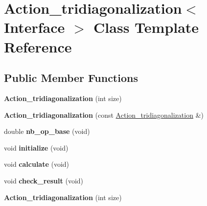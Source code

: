 \hypertarget{class_action__tridiagonalization}{}\section{Action\+\_\+tridiagonalization$<$ Interface $>$ Class Template Reference}
\label{class_action__tridiagonalization}
\subsection*{Public Member Functions}
\begin{DoxyCompactItemize}
\item 
\mbox{\label{class_action__tridiagonalization_a8d279f41467193bfba3154c4c6b06803}} 
{\bfseries Action\+\_\+tridiagonalization} (int size)
\item 
\mbox{\label{class_action__tridiagonalization_a8c56518c3b051aa81d9f206db803540f}} 
{\bfseries Action\+\_\+tridiagonalization} (const \hyperlink{class_action__tridiagonalization}{Action\+\_\+tridiagonalization} \&)
\item 
\mbox{\label{class_action__tridiagonalization_a78044c19d7428b20b0bb28b98a4b952d}} 
double {\bfseries nb\+\_\+op\+\_\+base} (void)
\item 
\mbox{\label{class_action__tridiagonalization_a41a1f82250727e2ebf3426ce0c28ddf7}} 
void {\bfseries initialize} (void)
\item 
\mbox{\label{class_action__tridiagonalization_a58d13671dd11a847e0a01a93dec683a3}} 
void {\bfseries calculate} (void)
\item 
\mbox{\label{class_action__tridiagonalization_ae0ae726d0c97c8305e0d8787c4fd6a09}} 
void {\bfseries check\+\_\+result} (void)
\item 
\mbox{\label{class_action__tridiagonalization_a8d279f41467193bfba3154c4c6b06803}} 
{\bfseries Action\+\_\+tridiagonalization} (int size)
\item 

\end{DoxyCompactItemize}
